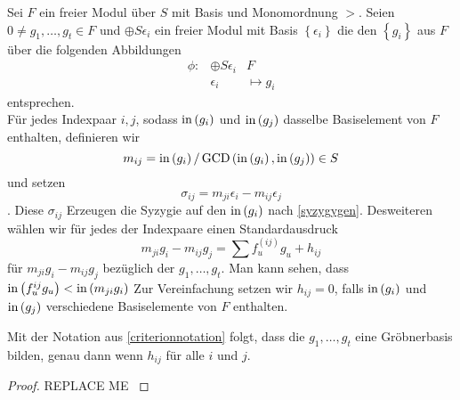 \documentclass{article}
\begin{document}
	\begin{nota}
		Sei 
		\( F \) 
		ein freier Modul \"uber
		\(S\)
		mit Basis und Monomordnung
		\( > \).
		Seien
		\( 0 \neq g_{1},\dots,g_{t} \in F\)
		und 
		\( \oplus S \epsilon_{i} \)
		ein freier Modul mit Basis 
		\( \left\{ \epsilon_{i} \right\} \)
		die den 
		\( \left\{ g_{i} \right\}\)
		aus 
		\( F \)
		\"uber die folgenden Abbildungen 
		\begin{align*}
			\phi:& \oplus S \epsilon_{i} & F \\
			& \epsilon_{i} & \mapsto g_{i} 
		\end{align*}
		entsprechen. \\
		F\"ur jedes Indexpaar 
		\( i, j \),
		sodass 
		\( \operatorname{in} \left( g_{i} \right) \)
		und
		\( \operatorname{in} \left( g_{j} \right) \)
		dasselbe Basiselement von
		\( F \)
		enthalten,
		definieren wir
		\[
			m_{ij} 
			= \operatorname{in} \left( g_{i} \right) 
			/ \operatorname{GCD} \left( \operatorname{in}\left( g_{i} \right), 
			\operatorname{in} \left( g_{j} \right) \right) \in S
		\]
		und setzen
		\[
			\sigma_{ij} 
			= m_{ji} \epsilon_{i} 
			- m_{ij} \epsilon_{j}
		\].
		Diese 
		\( \sigma_{ij} \)
		Erzeugen die Syzygie auf den 
		\( \operatorname{in} \left( g_{i} \right) \)
		nach \ref{syzygygen}.
		Desweiteren w\"ahlen wir f\"ur jedes der Indexpaare einen Standardausdruck 
		\[ 
			m_{ji} g_{i} -m_{ij} g_{j} = \sum f_{u}^{\left( ij \right) } g_{u} + h_{ij}
		\]
		f\"ur 
		\(  m_{ji} g_{i} -m_{ij} g_{j} \)
		bez\"uglich der
		\( g_{1},\dots , g_{t} \).
		Man kann sehen, 
		dass 
		\( \operatorname{in} \left( f_{u}^{ij} g_{u} \right) < \operatorname{in} \left( m_{ji}g_{i} \right) \)
		Zur Vereinfachung setzen wir
		\( h_{ij} = 0 \),
		falls 
		\( \operatorname{in}\left( g_{i} \right) \)
		und 
		\( \operatorname{in}\left( g_{j} \right) \)
		verschiedene Basiselemente von 
		\( F \)
		enthalten.
	\end{nota}
	\begin{thm}
		Mit der Notation aus \ref{criterionnotation} folgt,
		dass die 
		\( g_{1},\dots,g_{t} \)
		eine Gr\"obnerbasis bilden,
		genau dann wenn 
		\( h_{ij} \)
		f\"ur alle 
		\( i \)
		und 
		\( j\).
		\begin{proof}
			{\color{red} REPLACE ME }
		\end{proof}
	\end{thm}
\end{document}
